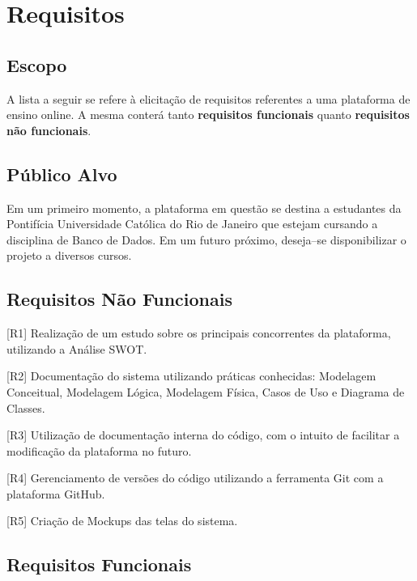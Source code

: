\documentclass[graduacao,brazil]{ThesisPUC}
\begin{document}

\section{Requisitos}

\subsection{Escopo}

A lista a seguir se refere \`{a} elicita\c{c}\~{a}o de requisitos referentes a uma plataforma de ensino online.
A mesma conter\'{a} tanto \textbf{requisitos funcionais} quanto \textbf{requisitos n\~{a}o funcionais}.

\subsection{P\'{u}blico Alvo}

Em um primeiro momento, a plataforma em quest\~{a}o se destina a estudantes da Pontif\'{i}cia Universidade
Cat\'{o}lica do Rio de Janeiro que estejam cursando a disciplina de Banco de Dados. Em um futuro pr\'{o}ximo, 
deseja--se disponibilizar o projeto a diversos cursos.

\subsection{Requisitos N\~{a}o Funcionais}

[R1] Realiza\c{c}\~{a}o de um estudo sobre os principais concorrentes da plataforma, utilizando a An\'{a}lise SWOT.

[R2] Documenta\c{c}\~{a}o do sistema utilizando pr\'{a}ticas conhecidas: Modelagem Conceitual, Modelagem L\'{o}gica,
Modelagem F\'{i}sica, Casos de Uso e Diagrama de Classes.

[R3] Utiliza\c{c}\~{a}o de documenta\c{c}\~{a}o interna do c\'{o}digo, com o intuito de facilitar a modifica\c{c}\~{a}o da 
plataforma no futuro.

[R4] Gerenciamento de vers\~{o}es do c\'{o}digo utilizando a ferramenta Git com a plataforma GitHub.

[R5] Cria\c{c}\~{a}o de Mockups das telas do sistema.

\subsection{Requisitos Funcionais}
\end{document}
